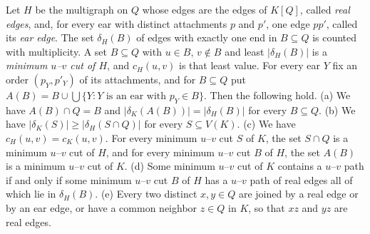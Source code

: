 \begin{lemma}
\label{lem:zz-multigraph}
Let $H$ be the multigraph on $Q$ whose edges are the edges of $K[Q]$, called \emph{real edges}, and, for every ear with distinct attachments $p$ and $p'$, one edge $pp'$, called its \emph{ear edge}.
The set $\delta_H(B)$ of edges with exactly one end in $B \subseteq Q$ is counted with multiplicity.
A set $B \subseteq Q$ with $u \in B$, $v \notin B$ and least $|\delta_H(B)|$ is a \emph{minimum $u$--$v$ cut of $H$}, and $c_H(u, v)$ is that least value.
For every ear $Y$ fix an order $(p_Y, p'_Y)$ of its attachments, and for $B \subseteq Q$ put $A(B) = B \cup \bigcup \{Y : Y \text{ is an ear with } p_Y \in B\}$.
Then the following hold.
(a) We have $A(B) \cap Q = B$ and $|\delta_K(A(B))| = |\delta_H(B)|$ for every $B \subseteq Q$.
(b) We have $|\delta_K(S)| \geq |\delta_H(S \cap Q)|$ for every $S \subseteq V(K)$.
(c) We have $c_H(u, v) = c_K(u, v)$.
For every minimum $u$--$v$ cut $S$ of $K$, the set $S \cap Q$ is a minimum $u$--$v$ cut of $H$, and for every minimum $u$--$v$ cut $B$ of $H$, the set $A(B)$ is a minimum $u$--$v$ cut of $K$.
(d) Some minimum $u$--$v$ cut of $K$ contains a $u$--$v$ path if and only if some minimum $u$--$v$ cut $B$ of $H$ has a $u$--$v$ path of real edges all of which lie in $\delta_H(B)$.
(e) Every two distinct $x, y \in Q$ are joined by a real edge or by an ear edge, or have a common neighbor $z \in Q$ in $K$, so that $xz$ and $yz$ are real edges.
\end{lemma}

